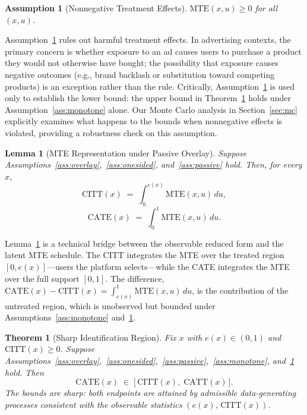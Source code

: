 \documentclass[11pt]{article}
\newtheorem{assumption}{Assumption}
\newtheorem{theorem}{Theorem}
\newtheorem{lemma}{Lemma}
\begin{document}
\begin{assumption}[Nonnegative Treatment Effects]
\label{ass:nonneg}
$\mathrm{MTE}(x,u) \geq 0$ for all $(x,u)$.
\end{assumption}

Assumption~\ref{ass:nonneg} rules out harmful treatment effects.  In advertising
contexts, the primary concern is whether exposure to an ad causes users to
purchase a product they would not otherwise have bought; the possibility that
exposure causes negative outcomes (e.g., brand backlash or substitution toward
competing products) is an exception rather than the rule.  Critically,
Assumption~\ref{ass:nonneg} is used only to establish the lower bound: the upper
bound in Theorem~\ref{thm:sharp} holds under Assumption~\ref{ass:monotone}
alone.  Our Monte Carlo analysis in Section~\ref{sec:mc} explicitly examines
what happens to the bounds when nonnegative effects is violated, providing a
robustness check on this assumption.

\begin{lemma}[MTE Representation under Passive Overlay]
\label{lem:overlay}
Suppose Assumptions~\ref{ass:overlay},~\ref{ass:onesided}, and~\ref{ass:passive}
hold.  Then, for every $x$,
\begin{equation}
  \mathrm{CITT}(x) \;=\; \int_0^{e(x)} \mathrm{MTE}(x,u)\,du,
  \label{eq:citt_rep}
\end{equation}
\begin{equation}
  \mathrm{CATE}(x) \;=\; \int_0^1 \mathrm{MTE}(x,u)\,du.
  \label{eq:cate_rep}
\end{equation}
\end{lemma}

Lemma~\ref{lem:overlay} is a technical bridge between the observable reduced
form and the latent MTE schedule.  The CITT integrates the MTE over the treated
region $[0, e(x)]$---users the platform selects---while the CATE integrates the
MTE over the full support $[0,1]$.  The difference, $\mathrm{CATE}(x) -
\mathrm{CITT}(x) = \int_{e(x)}^1 \mathrm{MTE}(x,u)\,du$, is the contribution
of the untreated region, which is unobserved but bounded under
Assumptions~\ref{ass:monotone} and~\ref{ass:nonneg}.

\begin{theorem}[Sharp Identification Region]
\label{thm:sharp}
Fix $x$ with $e(x) \in (0,1)$ and $\mathrm{CITT}(x) \geq 0$.  Suppose
Assumptions~\ref{ass:overlay},~\ref{ass:onesided},~\ref{ass:passive},~\ref{ass:monotone},
and~\ref{ass:nonneg} hold.  Then
\begin{equation}
  \mathrm{CATE}(x) \;\in\; \bigl[\,\mathrm{CITT}(x),\;\mathrm{CATT}(x)\,\bigr].
  \label{eq:bounds}
\end{equation}
The bounds are sharp: both endpoints are attained by admissible
data-generating processes consistent with the observable statistics
$(e(x),\, \mathrm{CITT}(x))$.
\end{theorem}
\end{document}
